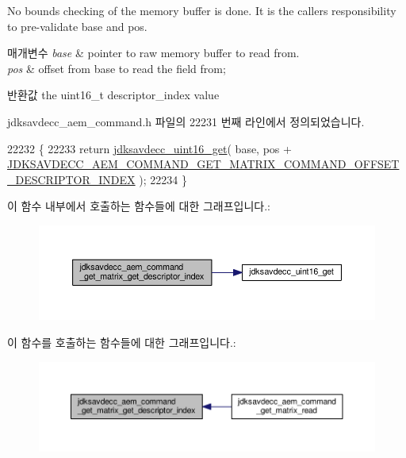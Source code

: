 No bounds checking of the memory buffer is done. It is the caller\textquotesingle{}s responsibility to pre-\/validate base and pos.


\begin{DoxyParams}{매개변수}
{\em base} & pointer to raw memory buffer to read from. \\
\hline
{\em pos} & offset from base to read the field from; \\
\hline
\end{DoxyParams}
\begin{DoxyReturn}{반환값}
the uint16\+\_\+t descriptor\+\_\+index value 
\end{DoxyReturn}


jdksavdecc\+\_\+aem\+\_\+command.\+h 파일의 22231 번째 라인에서 정의되었습니다.


\begin{DoxyCode}
22232 \{
22233     \textcolor{keywordflow}{return} \hyperlink{group__endian_ga3fbbbc20be954aa61e039872965b0dc9}{jdksavdecc\_uint16\_get}( base, pos + 
      \hyperlink{group__command__get__matrix_ga07d69e308ef14c7d4663a7c43e645173}{JDKSAVDECC\_AEM\_COMMAND\_GET\_MATRIX\_COMMAND\_OFFSET\_DESCRIPTOR\_INDEX}
       );
22234 \}
\end{DoxyCode}


이 함수 내부에서 호출하는 함수들에 대한 그래프입니다.\+:
\nopagebreak
\begin{figure}[H]
\begin{center}
\leavevmode
\includegraphics[width=350pt]{group__command__get__matrix_gae06827e874371135ab799f617f6723b3_cgraph}
\end{center}
\end{figure}




이 함수를 호출하는 함수들에 대한 그래프입니다.\+:
\nopagebreak
\begin{figure}[H]
\begin{center}
\leavevmode
\includegraphics[width=350pt]{group__command__get__matrix_gae06827e874371135ab799f617f6723b3_icgraph}
\end{center}
\end{figure}


